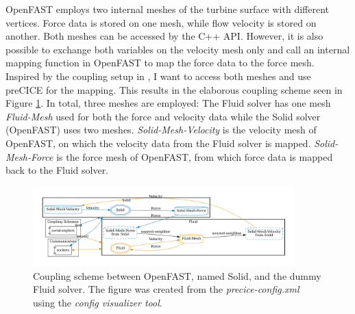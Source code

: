OpenFAST employs two internal meshes of the turbine surface with different vertices. Force data is stored on one mesh, while flow velocity is stored on another. Both meshes can be accessed by the C++ API. However, it is also possible to exchange both variables on the velocity mesh only and call an internal mapping function in OpenFAST to map the force data to the force mesh. Inspired by the coupling setup in \cite{Taschner:2022}, I want to access both meshes and use preCICE for the mapping. This results in the elaborous coupling scheme seen in Figure \ref{fig:openfast:coupling}. In total, three meshes are employed: The Fluid solver has one mesh \textit{Fluid-Mesh} used for both the force and velocity data while the Solid solver (OpenFAST) uses two meshes. \textit{Solid-Mesh-Velocity} is the velocity mesh of OpenFAST, on which the velocity data from the Fluid solver is mapped. \textit{Solid-Mesh-Force} is the force mesh of OpenFAST, from which force data is mapped back to the Fluid solver.

\begin{figure}[h]
	\centering
	\includegraphics[width=0.9\textwidth]{images/openfast-dummy-coupling-scheme.png}
	\caption{Coupling scheme between OpenFAST, named Solid, and the dummy Fluid solver. The figure was created from the \textit{precice-config.xml} using the \textit{config visualizer tool}\protect\footnotemark.}
	\label{fig:openfast:coupling}
\end{figure}


